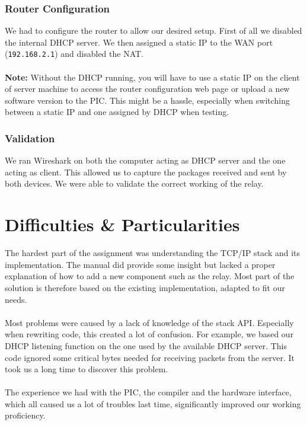 \documentclass[11pt]{article}
\begin{document}
\subsubsection{Router Configuration}
We had to configure the router to allow our desired setup. First of all we
disabled the internal DHCP server. We then assigned a static IP to the WAN port
(\texttt{192.168.2.1}) and disabled the NAT. \\
\\
\textbf{Note:} Without the DHCP running, you will have to use a static IP on the
client of server machine to access the router configuration web page or upload a
new software version to the PIC. This might be a hassle, especially when
switching between a static IP and one assigned by DHCP when testing.

\subsubsection{Validation}
We ran Wireshark on both the computer acting as DHCP server and the one acting
as client. This allowed us to capture the packages received and sent by both
devices. We were able to validate the correct working of the relay.

\section{Difficulties \& Particularities}
The hardest part of the assignment was understanding the TCP/IP stack and its
implementation. The manual did provide some insight but lacked a proper
explanation of how to add a new component such as the relay. Most part of the
solution is therefore based on the existing implementation, adapted to fit our
needs.
\\\\
Most problems were caused by a lack of knowledge of the stack API. Especially
when rewriting code, this created a lot of confusion. For example, we based our
DHCP listening function on the one used by the available DHCP server. This code
ignored some critical bytes needed for receiving packets from the server. It
took us a long time to discover this problem.
\\\\
The experience we had with the PIC, the compiler and the hardware interface,
which all caused us a lot of troubles last time, significantly improved our
working proficiency.
\end{document}
